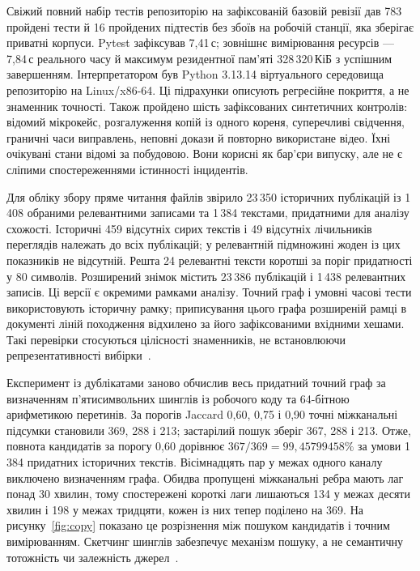 Свіжий повний набір тестів репозиторію на зафіксованій базовій ревізії дав 783 пройдені тести й 16 пройдених підтестів без збоїв на робочій станції, яка зберігає приватні корпуси. Pytest зафіксував 7,41\,с; зовнішнє вимірювання ресурсів --- 7,84\,с реального часу й максимум резидентної пам'яті 328\,320\,КіБ з успішним завершенням. Інтерпретатором був Python 3.13.14 віртуального середовища репозиторію на Linux/x86-64. Ці підрахунки описують регресійне покриття, а не знаменник точності. Також пройдено шість зафіксованих синтетичних контролів: відомий мікрокейс, розгалуження копій із одного кореня, суперечливі свідчення, граничні часи виправлень, неповні докази й повторно використане відео. Їхні очікувані стани відомі за побудовою. Вони корисні як бар'єри випуску, але не є сліпими спостереженнями істинності інцидентів.

Для обліку збору пряме читання файлів звірило 23\,350 історичних публікацій із 1\,408 обраними релевантними записами та 1\,384 текстами, придатними для аналізу схожості. Історичні 459 відсутніх сирих текстів і 49 відсутніх лічильників переглядів належать до всіх публікацій; у релевантній підмножині жоден із цих показників не відсутній. Решта 24 релевантні тексти коротші за поріг придатності у 80 символів. Розширений знімок містить 23\,386 публікацій і 1\,438 релевантних записів. Ці версії є окремими рамками аналізу. Точний граф і умовні часові тести використовують історичну рамку; приписування цього графа розширеній рамці в документі ліній походження відхилено за його зафіксованими вхідними хешами. Такі перевірки стосуються цілісності знаменників, не встановлюючи репрезентативності вибірки~\cite{Olteanu2019,VicentePaula2023}.

Експеримент із дублікатами заново обчислив весь придатний точний граф за визначенням п'ятисимвольних шинглів із робочого коду та 64-бітною арифметикою перетинів. За порогів Jaccard 0,60, 0,75 і 0,90 точні міжканальні підсумки становили 369, 288 і 213; застарілий пошук зберіг 367, 288 і 213. Отже, повнота кандидатів за порогу 0,60 дорівнює $367/369=99{,}45799458\%$ за умови 1\,384 придатних історичних текстів. Вісімнадцять пар у межах одного каналу виключено визначенням графа. Обидва пропущені міжканальні ребра мають лаг понад 30 хвилин, тому спостережені короткі лаги лишаються 134 у межах десяти хвилин і 198 у межах тридцяти, кожен із них тепер поділено на 369. На рисунку~\ref{fig:copy} показано це розрізнення між пошуком кандидатів і точним вимірюванням. Скетчинг шинглів забезпечує механізм пошуку, а не семантичну тотожність чи залежність джерел~\cite{Broder1997}.


